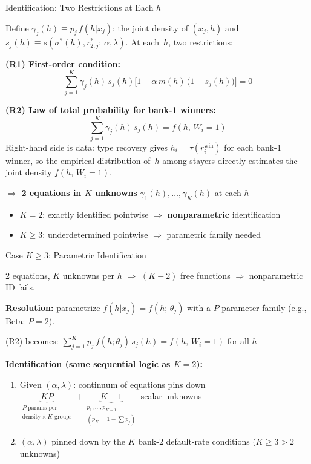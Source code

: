 \documentclass[10pt,aspectratio=169]{beamer}
\begin{document}
\begin{frame}{Identification: Two Restrictions at Each $h$}

Define $\gamma_j(h) \equiv p_j\, f(h|x_j)$: the joint density of $(x_j, h)$  and $s_j(h) \equiv s(\sigma^*(h), r_{2,j}^*;\, \alpha, \lambda)$.  At each~$h$, two restrictions:

\vspace{0.15cm}
\textbf{(R1) First-order condition:}
$$\sum_{j=1}^K \gamma_j(h)\, s_j(h)\Big[1 - \alpha\, m(h)\,\big(1\!-\!s_j(h)\big)\Big] = 0$$

\textbf{(R2) Law of total probability for bank-1 winners:}
$$\sum_{j=1}^K \gamma_j(h)\, s_j(h) = f(h,\, W_i\!=\!1)$$
Right-hand side is data: type recovery gives $h_i = \tau(r_i^{\text{win}})$ for each bank-1 winner, so the empirical distribution of~$h$ among stayers directly estimates the joint density $f(h,\, W_i\!=\!1)$.

\vspace{0.15cm}
$\Rightarrow$ \textbf{2 equations in $K$ unknowns} $\gamma_1(h), \ldots, \gamma_K(h)$ at each $h$
\begin{itemize}
    \item $K = 2$: exactly identified pointwise $\Rightarrow$ \textbf{nonparametric} identification
    \item $K \geq 3$: underdetermined pointwise $\Rightarrow$ parametric family needed
\end{itemize}
\end{frame}


\begin{frame}{Case $K \geq 3$: Parametric Identification}

2 equations, $K$ unknowns per $h$ $\Rightarrow$ $(K-2)$ free functions $\Rightarrow$ nonparametric ID fails.


\vspace{0.2cm}
\textbf{Resolution:} parametrize $f(h|x_j) = f(h;\, \theta_j)$ with a $P$-parameter family (e.g., Beta: $P = 2$).

\vspace{0.2cm}
(R2) becomes: $\sum_{j=1}^K p_j\, f(h;\theta_j)\, s_j(h) = f(h,\, W_i\!=\!1)$ for all $h$

\vspace{0.2cm}
\textbf{Identification (same sequential logic as $K = 2$):}
\begin{enumerate}
    \item Given $(\alpha, \lambda)$: continuum of equations pins down $\underbrace{KP}_{\substack{P \text{ params per} \\ \text{density} \times K \text{ groups}}} + \underbrace{K - 1}_{\substack{p_1,\ldots,p_{K-1} \\ (p_K = 1 - \sum p_j)}}$ scalar unknowns
    \item $(\alpha, \lambda)$ pinned down by the $K$ bank-2 default-rate conditions ($K \geq 3 > 2$ unknowns)
\end{enumerate}

\end{frame}
\end{document}
